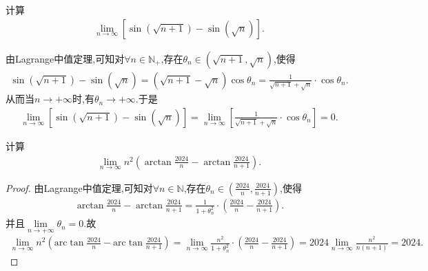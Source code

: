 \documentclass[../../main.tex]{subfiles}
\begin{document}
\begin{example}
计算
\begin{align*}
\lim_{n \to \infty} [\sin(\sqrt{n + 1}) - \sin(\sqrt{n})].
\end{align*}
\end{example}
\begin{solution}
由Lagrange中值定理,可知对$\forall n\in\mathbb{N}_+$,存在$\theta_n \in(\sqrt{n+1},\sqrt{n})$,使得
\begin{align*}
\sin(\sqrt{n+1})-\sin(\sqrt{n})=(\sqrt{n+1}-\sqrt{n})\cos\theta_n=\frac{1}{\sqrt{n+1}+\sqrt{n}}\cdot \cos\theta_n.
\end{align*}
从而当$n\to +\infty$时,有$\theta_n \to +\infty$.于是
\begin{align*}
\lim_{n \to \infty} [\sin(\sqrt{n + 1}) - \sin(\sqrt{n})]=\lim_{n \to \infty} [\frac{1}{\sqrt{n+1}+\sqrt{n}}\cdot \cos\theta_n]=0.
\end{align*}
\end{solution}

\begin{example}
计算
\begin{align*}
\lim_{n \to \infty} n^2 \left(\arctan\frac{2024}{n} - \arctan\frac{2024}{n + 1}\right).
\end{align*}
\end{example}
\begin{proof}
由Lagrange中值定理,可知对$\forall n\in\mathbb{N}$,存在$\theta_n\in(\frac{2024}{n},\frac{2024}{n + 1})$,使得
\begin{align*}
\arctan\frac{2024}{n} - \arctan\frac{2024}{n + 1} = \frac{1}{1+\theta _{n}^{2}}\cdot \left( \frac{2024}{n}-\frac{2024}{n+1} \right).
\end{align*}
并且$\underset{n\rightarrow +\infty}{\lim}\theta _n=0$.故
\begin{align*}
\lim_{n\rightarrow \infty} n^2\left( \mathrm{arc}\tan \frac{2024}{n}-\mathrm{arc}\tan \frac{2024}{n+1} \right) =\lim_{n\rightarrow \infty} \frac{n^2}{1+\theta _{n}^{2}}\cdot \left( \frac{2024}{n}-\frac{2024}{n+1} \right) =2024\lim_{n\rightarrow \infty} \frac{n^2}{n\left( n+1 \right)}=2024.
\end{align*}
\end{proof}
\end{document}
